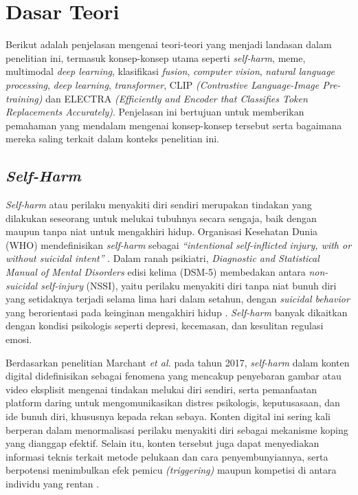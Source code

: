 \section{Dasar Teori} \label{II.teori}
Berikut adalah penjelasan mengenai teori-teori yang menjadi landasan dalam penelitian ini, termasuk konsep-konsep utama seperti \textit{self-harm}, meme, multimodal \textit{deep learning}, klasifikasi \textit{fusion}, \textit{computer vision}, \textit{natural language processing}, \textit{deep learning}, \textit{transformer}, CLIP \textit{(Contrastive Language-Image Pre-training)} dan ELECTRA \textit{(Efficiently and Encoder that Classifies Token Replacements Accurately)}. Penjelasan ini bertujuan untuk memberikan pemahaman yang mendalam mengenai konsep-konsep tersebut serta bagaimana mereka saling terkait dalam konteks penelitian ini.

\subsection{\textit{Self-Harm}} \label{II.teori10}
\textit{Self-harm} atau perilaku menyakiti diri sendiri merupakan tindakan yang dilakukan seseorang untuk melukai tubuhnya secara sengaja, baik dengan maupun tanpa niat untuk mengakhiri hidup. Organisasi Kesehatan Dunia (WHO) mendefinisikan \textit{self-harm} sebagai \textit{ ``intentional self-inflicted injury, with or without suicidal intent''} \cite{WHO2014PreventingSuicide}. Dalam ranah psikiatri, \textit{Diagnostic and Statistical Manual of Mental Disorders} edisi kelima (DSM-5) membedakan antara \textit{non-suicidal self-injury} (NSSI), yaitu perilaku menyakiti diri tanpa niat bunuh diri yang setidaknya terjadi selama lima hari dalam setahun, dengan \textit{suicidal behavior} yang berorientasi pada keinginan mengakhiri hidup \cite{APA2022_DSM5TR}. \textit{Self-harm} banyak dikaitkan dengan kondisi psikologis seperti depresi, kecemasan, dan kesulitan regulasi emosi.

Berdasarkan penelitian Marchant \textit{et al.} pada tahun 2017, \textit{self-harm} dalam konten digital didefinisikan sebagai fenomena yang mencakup penyebaran gambar atau video eksplisit mengenai tindakan melukai diri sendiri, serta pemanfaatan platform daring untuk mengomunikasikan distres psikologis, keputusasaan, dan ide bunuh diri, khususnya kepada rekan sebaya. Konten digital ini sering kali berperan dalam menormalisasi perilaku menyakiti diri sebagai mekanisme koping yang dianggap efektif. Selain itu, konten tersebut juga dapat menyediakan informasi teknis terkait metode pelukaan dan cara penyembunyiannya, serta berpotensi menimbulkan efek pemicu \textit{(triggering)} maupun kompetisi di antara individu yang rentan \cite{Marchant2017}.

